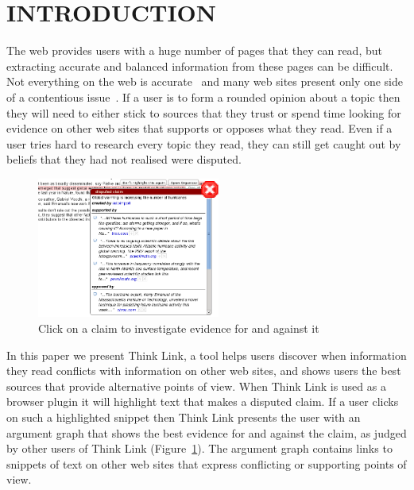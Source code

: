 \documentclass{chi2009}
\begin{document}

\section{INTRODUCTION}

The web provides users with a huge number of pages that they can read, but extracting accurate and balanced information from these pages can be difficult. Not everything on the web is accurate~\cite{Mintz2002,Neumann2003,Resnik1998,Zhou2004} and many web sites present only one side of a contentious issue~\cite{Herman2002,Gentzkow2007}. If a user is to form a rounded opinion about a topic then they will need to either stick to sources that they trust or spend time looking for evidence on other web sites that supports or opposes what they read. Even if a user tries hard to research every topic they read, they can still get caught out by beliefs that they had not realised were disputed.

\begin{figure}[tb]
	\begin{center}
	\includegraphics[width=6cm]{../screenshots/v2_popup.png}
	\caption{Click on a claim to investigate evidence for and against it}
	\label{claimview}
	\end{center}
\end{figure}

In this paper we present Think Link, a tool helps users discover when information they read conflicts with information on other web sites, and shows users the best sources that provide alternative points of view. When Think Link is used as a browser plugin it will highlight text that makes a disputed claim. If a user clicks on such a highlighted snippet then Think Link presents the user with an argument graph that shows the best evidence for and against the claim, as judged by other users of Think Link (Figure~\ref{claimview}). The argument graph contains links to snippets of text on other web sites that express conflicting or supporting points of view.
\end{document}
